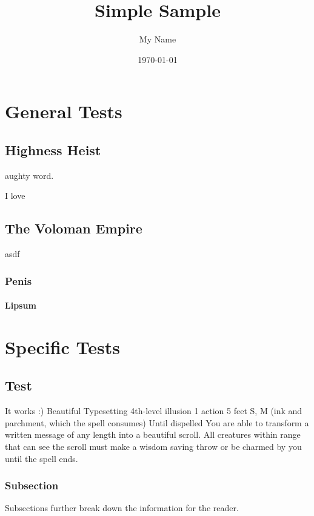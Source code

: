 \documentclass[letterpaper,twocolumn,openany,hidelinks]{memoir}
\title{Simple Sample} %
\author{My Name} %
\date{\today} %
\begin{document}
\begin{KeepFromToc}
	\tableofcontents
\end{KeepFromToc}

\part{General Tests}

\chapter{Highness Heist}

aughty word.
\lipsum[1]

\par

I love 

\chapter{The Voloman Empire}

asdf

\section{Penis}
\subsection{Lipsum}
\lipsum

\part{Specific Tests}

\chapter{Test}
It works :)
\RPGSpellHeader
	{Beautiful Typesetting}
	{4th-level illusion}
	{1 action}
	{5 feet}
	{S, M (ink and parchment, which the spell consumes)}
	{Until dispelled}
You are able to transform a written message of any length into a beautiful scroll. All creatures within range that can see the scroll must make a wisdom saving throw or be charmed by you until the spell ends.

\section{Subsection}
Subsections further break down the information for the reader.
\end{document}
